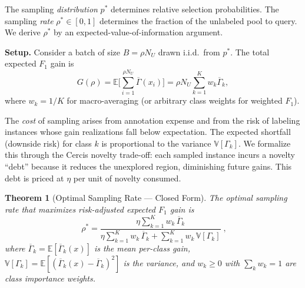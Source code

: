\documentclass[12pt,a4paper]{article}
\newtheorem{theorem}{Theorem}[section]
\newcommand{\E}{\mathbb{E}}
\newcommand{\V}{\mathbb{V}}
\begin{document}
The sampling \emph{distribution} $p^*$ determines relative selection
probabilities.  The sampling \emph{rate} $\rho^*\in[0,1]$ determines the
fraction of the unlabeled pool to query.  We derive $\rho^*$ by an
expected-value-of-information argument.

\medskip\noindent
\textbf{Setup.}
Consider a batch of size $B=\rho N_U$ drawn i.i.d.\ from $p^*$.
The total expected $F_1$ gain is
\begin{equation}\label{eq:total-gain}
    G(\rho) = \E\Big[\sum_{i=1}^{\rho N_U} \overline{\Gamma}(x_i)\Big]
    = \rho N_U\sum_{k=1}^K w_k\overline{\Gamma}_k,
\end{equation}
where $w_k=1/K$ for macro-averaging (or arbitrary class weights for
weighted $F_1$).

The \emph{cost} of sampling arises from annotation expense and from the
risk of labeling instances whose gain realizations fall below expectation.
The expected shortfall (downside risk) for class $k$ is proportional to
the variance $\V[\Gamma_k]$.  We formalize this through the Cercis novelty
trade-off: each sampled instance incurs a novelty ``debt'' because it
reduces the unexplored region, diminishing future gains.  This
debt is priced at $\eta$ per unit of novelty consumed.

\begin{theorem}[Optimal Sampling Rate — Closed Form]
\label{thm:optimal-rate}
The optimal sampling rate that maximizes risk-adjusted expected $F_1$ gain
is
\begin{equation}\label{eq:rho-star}
    \boxed{\;
    \rho^* =
    \frac{\eta\displaystyle\sum_{k=1}^{K} w_k\,\overline{\Gamma}_k}
         {\eta\displaystyle\sum_{k=1}^{K} w_k\,\overline{\Gamma}_k
          + \displaystyle\sum_{k=1}^{K} w_k\,\V[\Gamma_k]}
    \;},
\end{equation}
where $\overline{\Gamma}_k=\E[\overline{\Gamma}_k(x)]$ is the mean per-class
gain, $\V[\Gamma_k]=\E[(\overline{\Gamma}_k(x)-\overline{\Gamma}_k)^2]$ is
the variance, and $w_k\geq0$ with $\sum_k w_k=1$ are class importance
weights.
\end{theorem}
\end{document}
